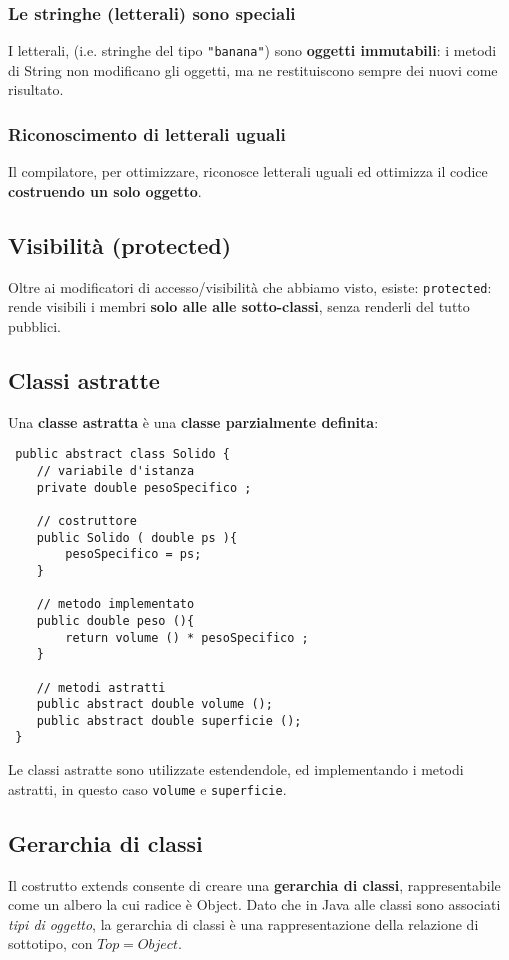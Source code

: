 \documentclass[a4paper,10pt]{article}
\begin{document}
\subsubsection{Le stringhe (letterali) sono speciali}
I letterali, (i.e. stringhe del tipo \texttt{"banana"}) sono \textbf{oggetti immutabili}: i metodi di String non modificano gli oggetti, ma ne restituiscono sempre dei nuovi come risultato.

\subsubsection{Riconoscimento di letterali uguali}
Il compilatore, per ottimizzare, riconosce letterali uguali ed ottimizza il codice \textbf{costruendo un solo oggetto}.

\subsection{Visibilità (protected)}
Oltre ai modificatori di accesso/visibilità che abbiamo visto, esiste: \texttt{protected}: rende visibili i membri \textbf{solo alle alle sotto-classi}, senza renderli del tutto pubblici.

\newpage
\subsection{Classi astratte}
Una \textbf{classe astratta} è una \textbf{classe parzialmente definita}:

\begin{lstlisting}
 public abstract class Solido {
    // variabile d'istanza
    private double pesoSpecifico ;
    
    // costruttore
    public Solido ( double ps ){
        pesoSpecifico = ps;
    }
    
    // metodo implementato
    public double peso (){
        return volume () * pesoSpecifico ;
    }
    
    // metodi astratti
    public abstract double volume ();
    public abstract double superficie ();
 }
\end{lstlisting}

Le classi astratte sono utilizzate estendendole, ed implementando i metodi astratti, in questo caso \texttt{volume} e \texttt{superficie}.

\subsection{Gerarchia di classi}
Il costrutto extends consente di creare una \textbf{gerarchia di classi}, rappresentabile come un albero la cui radice è Object. Dato che in Java alle classi sono associati \emph{tipi di oggetto}, la gerarchia di classi è una rappresentazione della relazione di sottotipo, con $Top = Object$.\smallskip
\end{document}
